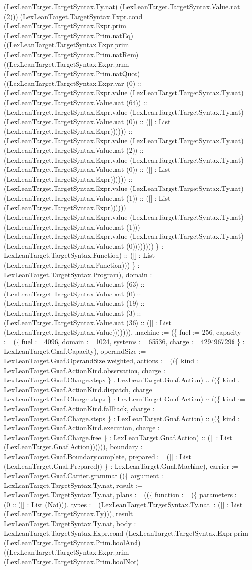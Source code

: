 \documentclass[11pt]{article}
\begin{document}
(LexLeanTarget.TargetSyntax.Ty.nat) (LexLeanTarget.TargetSyntax.Value.nat (2))) (LexLeanTarget.TargetSyntax.Expr.cond (LexLeanTarget.TargetSyntax.Expr.prim (LexLeanTarget.TargetSyntax.Prim.natEq) ((LexLeanTarget.TargetSyntax.Expr.prim (LexLeanTarget.TargetSyntax.Prim.natRem) ((LexLeanTarget.TargetSyntax.Expr.prim (LexLeanTarget.TargetSyntax.Prim.natQuot) ((LexLeanTarget.TargetSyntax.Expr.var (0) :: (LexLeanTarget.TargetSyntax.Expr.value (LexLeanTarget.TargetSyntax.Ty.nat) (LexLeanTarget.TargetSyntax.Value.nat (64)) :: (LexLeanTarget.TargetSyntax.Expr.value (LexLeanTarget.TargetSyntax.Ty.nat) (LexLeanTarget.TargetSyntax.Value.nat (0)) :: ([] : List (LexLeanTarget.TargetSyntax.Expr)))))) :: (LexLeanTarget.TargetSyntax.Expr.value (LexLeanTarget.TargetSyntax.Ty.nat) (LexLeanTarget.TargetSyntax.Value.nat (2)) :: (LexLeanTarget.TargetSyntax.Expr.value (LexLeanTarget.TargetSyntax.Ty.nat) (LexLeanTarget.TargetSyntax.Value.nat (0)) :: ([] : List (LexLeanTarget.TargetSyntax.Expr)))))) :: (LexLeanTarget.TargetSyntax.Expr.value (LexLeanTarget.TargetSyntax.Ty.nat) (LexLeanTarget.TargetSyntax.Value.nat (1)) :: ([] : List (LexLeanTarget.TargetSyntax.Expr)))))) (LexLeanTarget.TargetSyntax.Expr.value (LexLeanTarget.TargetSyntax.Ty.nat) (LexLeanTarget.TargetSyntax.Value.nat (1))) (LexLeanTarget.TargetSyntax.Expr.value (LexLeanTarget.TargetSyntax.Ty.nat) (LexLeanTarget.TargetSyntax.Value.nat (0)))))))) \} : LexLeanTarget.TargetSyntax.Function) :: ([] : List (LexLeanTarget.TargetSyntax.Function))) \} : LexLeanTarget.TargetSyntax.Program), domain := (LexLeanTarget.TargetSyntax.Value.nat (63) :: (LexLeanTarget.TargetSyntax.Value.nat (0) :: (LexLeanTarget.TargetSyntax.Value.nat (19) :: (LexLeanTarget.TargetSyntax.Value.nat (3) :: (LexLeanTarget.TargetSyntax.Value.nat (36) :: ([] : List (LexLeanTarget.TargetSyntax.Value))))))), machine := (\{ fuel := 256, capacity := (\{ fuel := 4096, domain := 1024, systems := 65536, charge := 4294967296 \} : LexLeanTarget.Gnaf.Capacity), operandSize := LexLeanTarget.Gnaf.OperandSize.weighted, actions := ((\{ kind := LexLeanTarget.Gnaf.ActionKind.observation, charge := LexLeanTarget.Gnaf.Charge.steps \} : LexLeanTarget.Gnaf.Action) :: ((\{ kind := LexLeanTarget.Gnaf.ActionKind.dispatch, charge := LexLeanTarget.Gnaf.Charge.steps \} : LexLeanTarget.Gnaf.Action) :: ((\{ kind := LexLeanTarget.Gnaf.ActionKind.fallback, charge := LexLeanTarget.Gnaf.Charge.steps \} : LexLeanTarget.Gnaf.Action) :: ((\{ kind := LexLeanTarget.Gnaf.ActionKind.execution, charge := LexLeanTarget.Gnaf.Charge.free \} : LexLeanTarget.Gnaf.Action) :: ([] : List (LexLeanTarget.Gnaf.Action)))))), boundary := LexLeanTarget.Gnaf.Boundary.complete, prepared := ([] : List (LexLeanTarget.Gnaf.Prepared)) \} : LexLeanTarget.Gnaf.Machine), carrier := LexLeanTarget.Gnaf.Carrier.grammar ((\{ argument := LexLeanTarget.TargetSyntax.Ty.nat, result := LexLeanTarget.TargetSyntax.Ty.nat, plans := ((\{ function := (\{ parameters := (0 :: ([] : List (Nat))), types := (LexLeanTarget.TargetSyntax.Ty.nat :: ([] : List (LexLeanTarget.TargetSyntax.Ty))), result := LexLeanTarget.TargetSyntax.Ty.nat, body := LexLeanTarget.TargetSyntax.Expr.cond (LexLeanTarget.TargetSyntax.Expr.prim (LexLeanTarget.TargetSyntax.Prim.boolAnd) ((LexLeanTarget.TargetSyntax.Expr.prim (LexLeanTarget.TargetSyntax.Prim.boolNot) 
\end{document}
